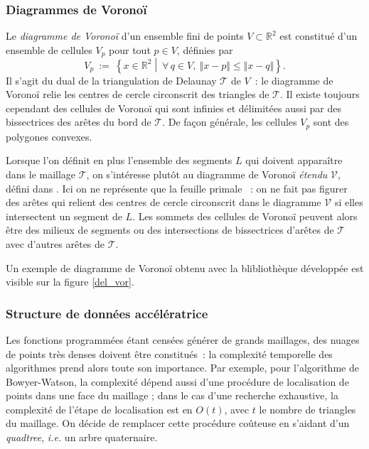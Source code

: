 \documentclass[12pt,a4paper]{report}
\begin{document}
\subsubsection{Diagrammes de Voronoï}

Le \emph{diagramme de Voronoï} d'un ensemble fini de points $V\subset\mathbb{R}^2$ est constitué d'un ensemble de cellules $V_p$ pour tout $p\in V$, définies par
\[V_p\ :=\ \left\{x\in\mathbb{R}^2\middle\vert\ \forall\,q\in V,\ \Vert x-p\Vert\leqslant\Vert x-q\Vert\right\}\text{.}\]
Il s'agit du dual de la triangulation de Delaunay $\mathcal{T}$ de $V$~: le diagramme de Voronoï relie les centres de cercle circonscrit des triangles de $\mathcal{T}$. Il existe toujours cependant des cellules de Voronoï qui sont infinies et délimitées aussi par des bissectrices des arêtes du bord de $\mathcal{T}$. De façon générale, les cellules $V_p$ sont des polygones convexes.

Lorsque l'on définit en plus l'ensemble des segments $L$ qui doivent apparaître dans le maillage $\mathcal{T}$, on s'intéresse plutôt au diagramme de Voronoï \emph{étendu} $\mathcal{V}$, défini dans \cite[pages 30-31]{Edelsbrunner}. Ici on ne représente que la \og feuille primale \fg{}~: on ne fait pas figurer des arêtes qui relient des centres de cercle circonscrit dans le diagramme $\mathcal{V}$ si elles intersectent un segment de $L$. Les sommets des cellules de Voronoï peuvent alors être des milieux de segments ou des intersections de bissectrices d'arêtes de $\mathcal{T}$ avec d'autres arêtes de $\mathcal{T}$.

Un exemple de diagramme de Voronoï obtenu avec la blibliothèque développée est visible sur la figure \ref{del_vor}.

\subsubsection{Structure de données accélératrice}

Les fonctions programmées étant censées générer de \og grands \fg{} maillages, des nuages de points très denses doivent être constitués~: la  complexité temporelle des algorithmes prend alors toute son importance. Par exemple, pour l'algorithme de Bowyer-Watson, la complexité dépend aussi d'une procédure de localisation de points dans une face du maillage ; dans le cas d'une recherche exhaustive, la complexité de l'étape de localisation est en $O(t)$, avec $t$ le nombre de triangles du maillage. On décide de remplacer cette procédure coûteuse en s'aidant d'un \emph{quadtree}, \emph{i.e.} un arbre quaternaire.
\end{document}
